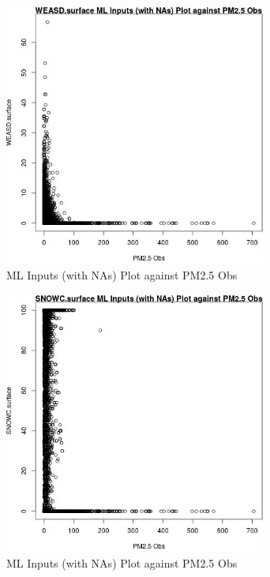 \begin{figure} 
\centering  
\includegraphics[width=0.77\textwidth]{Code_Outputs/Report_ML_input_PM25_Step4_part_e_de_duplicated_aves_compiled_2019-05-14wNAs_WEASDsurfacevPM25_Obs.jpg} 
\caption{\label{fig:Report_ML_input_PM25_Step4_part_e_de_duplicated_aves_compiled_2019-05-14wNAsWEASDsurfacevPM25_Obs}ML Inputs (with NAs) Plot against PM2.5 Obs} 
\end{figure} 
 

\begin{figure} 
\centering  
\includegraphics[width=0.77\textwidth]{Code_Outputs/Report_ML_input_PM25_Step4_part_e_de_duplicated_aves_compiled_2019-05-14wNAs_SNOWCsurfacevPM25_Obs.jpg} 
\caption{\label{fig:Report_ML_input_PM25_Step4_part_e_de_duplicated_aves_compiled_2019-05-14wNAsSNOWCsurfacevPM25_Obs}ML Inputs (with NAs) Plot against PM2.5 Obs} 
\end{figure} 
 

